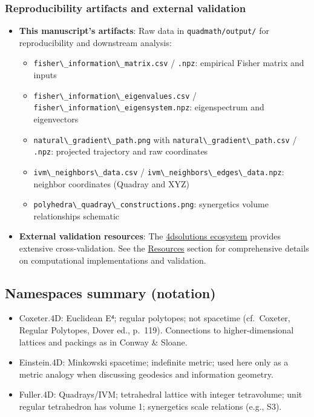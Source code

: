 \documentclass[
  10pt,
]{article}
\newcommand{\passthrough}[1]{#1}
\providecommand{\tightlist}{%
  \setlength{\itemsep}{0pt}\setlength{\parskip}{0pt}}
\begin{document}
\subsubsection{Reproducibility artifacts and external
validation}\label{reproducibility-artifacts-and-external-validation}

\begin{itemize}
\tightlist
\item
  \textbf{This manuscript's artifacts}: Raw data in
  \passthrough{\lstinline!quadmath/output/!} for reproducibility and
  downstream analysis:

  \begin{itemize}
  \tightlist
  \item
    \passthrough{\lstinline!fisher\_information\_matrix.csv!} /
    \passthrough{\lstinline!.npz!}: empirical Fisher matrix and inputs
  \item
    \passthrough{\lstinline!fisher\_information\_eigenvalues.csv!} /
    \passthrough{\lstinline!fisher\_information\_eigensystem.npz!}:
    eigenspectrum and eigenvectors
  \item
    \passthrough{\lstinline!natural\_gradient\_path.png!} with
    \passthrough{\lstinline!natural\_gradient\_path.csv!} /
    \passthrough{\lstinline!.npz!}: projected trajectory and raw
    coordinates
  \item
    \passthrough{\lstinline!ivm\_neighbors\_data.csv!} /
    \passthrough{\lstinline!ivm\_neighbors\_edges\_data.npz!}: neighbor
    coordinates (Quadray and XYZ)
  \item
    \passthrough{\lstinline!polyhedra\_quadray\_constructions.png!}:
    synergetics volume relationships schematic
  \end{itemize}
\item
  \textbf{External validation resources}: The
  \href{https://github.com/4dsolutions}{4dsolutions ecosystem} provides
  extensive cross-validation. See the \href{07_resources.md}{Resources}
  section for comprehensive details on computational implementations and
  validation.
\end{itemize}

\subsection{Namespaces summary
(notation)}\label{namespaces-summary-notation}

\begin{itemize}
\tightlist
\item
  Coxeter.4D: Euclidean E⁴; regular polytopes; not spacetime
  (cf.~Coxeter, Regular Polytopes, Dover ed., p.~119). Connections to
  higher-dimensional lattices and packings as in Conway \& Sloane.
\item
  Einstein.4D: Minkowski spacetime; indefinite metric; used here only as
  a metric analogy when discussing geodesics and information geometry.
\item
  Fuller.4D: Quadrays/IVM; tetrahedral lattice with integer tetravolume;
  unit regular tetrahedron has volume 1; synergetics scale relations
  (e.g., S3).
\end{itemize}
\end{document}

